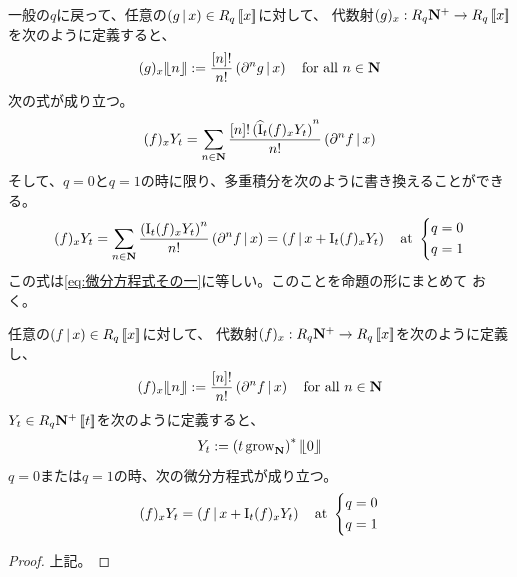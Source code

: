 {	一般の$q$に戻って、任意の$\mathinner{({g{\,|\,}x})}\in R_q\mathinner{[\![{x}]\!]}$に対して、
	代数射$(g)_x:R_q\mathbf{N}^+\to R_q\mathinner{[\![{x}]\!]}$を次のように定義すると、
	\begin{equation*}\begin{split}
		(g)_x{|\!\lfloor{n}\rfloor\!|} := \frac{{\mathinner{[{n}]}}!}{n!}\mathinner{({\partial^ng{\,|\,}x})}
		\quad\text{for all } n\in\mathbf{N}
	\end{split}\end{equation*}
	次の式が成り立つ。
	\begin{equation*}\begin{split}
		(f)_xY_t = \sum_{n\in\mathbf{N}}\frac{{\mathinner{[{n}]}}!\mathinner{({{{\widehat{\mathinner{\operatorname{I}}}}}_t(f)_xY_t})}^n}{n!}
			\mathinner{({\partial^nf{\,|\,}x})}
	\end{split}\end{equation*}
	そして、$q=0$と$q=1$の時に限り、多重積分を次のように書き換えることができる。
	\begin{equation*}\begin{split}
		(f)_xY_t = \sum_{n\in\mathbf{N}}\frac{\mathinner{({{\mathinner{\operatorname{I}}}_t(f)_xY_t})}^n}{n!}
			\mathinner{({\partial^nf{\,|\,}x})}
		= \mathinner{({f{\,|\,}x + {\mathinner{\operatorname{I}}}_t(f)_xY_t})} \quad\text{at } \left\{\begin{split}
				q &= 0 \\ q &= 1
			\end{split}\right.
	\end{split}\end{equation*}
	この式は\eqref{eq:微分方程式その一}に等しい。このことを命題の形にまとめて
	おく。

	\begin{proposition}[微分方程式と二分木]\label{prop:微分方程式と二分木} %
		任意の$\mathinner{({f{\,|\,}x})}\in R_q\mathinner{[\![{x}]\!]}$に対して、
		代数射$(f)_x:R_q\mathbf{N}^+\to R_q\mathinner{[\![{x}]\!]}$を次のように定義し、
		\begin{equation*}\begin{split}
			(f)_x{|\!\lfloor{n}\rfloor\!|} := \frac{{\mathinner{[{n}]}}!}{n!}\mathinner{({\partial^nf{\,|\,}x})}
			\quad\text{for all } n\in\mathbf{N}
		\end{split}\end{equation*}
		$Y_t\in R_q\mathbf{N}^+\mathinner{[\![{t}]\!]}$を次のように定義すると、
		\begin{equation*}\begin{split}
			Y_t := \mathinner{({t\,{\mathinner{\operatorname{grow}}}_{\ensuremath{\mathbf{N}}}})}^*{|\!\lfloor{0}\rfloor\!|}
		\end{split}\end{equation*}
		$q=0$または$q=1$の時、次の微分方程式が成り立つ。
		\begin{equation*}\begin{split}
			(f)_xY_t = \mathinner{({f{\,|\,}x + {\mathinner{\operatorname{I}}}_t(f)_xY_t})} 
			\quad\text{at } \left\{\begin{split}
				q &= 0 \\ q &= 1
			\end{split}\right.
		\end{split}\end{equation*}
	\end{proposition} %
	\begin{proof} %
		上記。
	\end{proof} %

}
